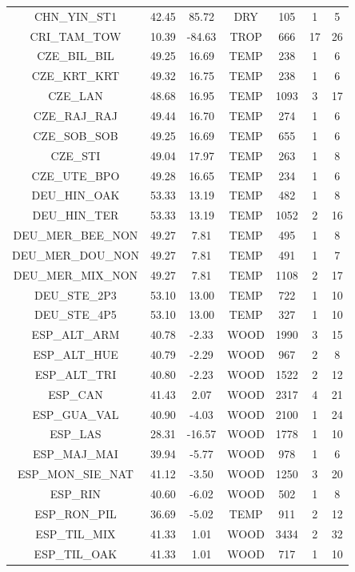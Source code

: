 \documentclass[11pt,twoside]{reedthesis}
\begin{document}
\begin{longtable}[t]{ccccccc}
CHN\_YIN\_ST1 & 42.45 & 85.72 & DRY & 105 & 1 & 5\\
CRI\_TAM\_TOW & 10.39 & -84.63 & TROP & 666 & 17 & 26\\
CZE\_BIL\_BIL & 49.25 & 16.69 & TEMP & 238 & 1 & 6\\
CZE\_KRT\_KRT & 49.32 & 16.75 & TEMP & 238 & 1 & 6\\
CZE\_LAN & 48.68 & 16.95 & TEMP & 1093 & 3 & 17\\
CZE\_RAJ\_RAJ & 49.44 & 16.70 & TEMP & 274 & 1 & 6\\
CZE\_SOB\_SOB & 49.25 & 16.69 & TEMP & 655 & 1 & 6\\
CZE\_STI & 49.04 & 17.97 & TEMP & 263 & 1 & 8\\
CZE\_UTE\_BPO & 49.28 & 16.65 & TEMP & 234 & 1 & 6\\
DEU\_HIN\_OAK & 53.33 & 13.19 & TEMP & 482 & 1 & 8\\
DEU\_HIN\_TER & 53.33 & 13.19 & TEMP & 1052 & 2 & 16\\
DEU\_MER\_BEE\_NON & 49.27 & 7.81 & TEMP & 495 & 1 & 8\\
DEU\_MER\_DOU\_NON & 49.27 & 7.81 & TEMP & 491 & 1 & 7\\
DEU\_MER\_MIX\_NON & 49.27 & 7.81 & TEMP & 1108 & 2 & 17\\
DEU\_STE\_2P3 & 53.10 & 13.00 & TEMP & 722 & 1 & 10\\
DEU\_STE\_4P5 & 53.10 & 13.00 & TEMP & 327 & 1 & 10\\
ESP\_ALT\_ARM & 40.78 & -2.33 & WOOD & 1990 & 3 & 15\\
ESP\_ALT\_HUE & 40.79 & -2.29 & WOOD & 967 & 2 & 8\\
ESP\_ALT\_TRI & 40.80 & -2.23 & WOOD & 1522 & 2 & 12\\
ESP\_CAN & 41.43 & 2.07 & WOOD & 2317 & 4 & 21\\
ESP\_GUA\_VAL & 40.90 & -4.03 & WOOD & 2100 & 1 & 24\\
ESP\_LAS & 28.31 & -16.57 & WOOD & 1778 & 1 & 10\\
ESP\_MAJ\_MAI & 39.94 & -5.77 & WOOD & 978 & 1 & 6\\
ESP\_MON\_SIE\_NAT & 41.12 & -3.50 & WOOD & 1250 & 3 & 20\\
ESP\_RIN & 40.60 & -6.02 & WOOD & 502 & 1 & 8\\
ESP\_RON\_PIL & 36.69 & -5.02 & TEMP & 911 & 2 & 12\\
ESP\_TIL\_MIX & 41.33 & 1.01 & WOOD & 3434 & 2 & 32\\
ESP\_TIL\_OAK & 41.33 & 1.01 & WOOD & 717 & 1 & 10\\

\end{longtable}
\end{document}
